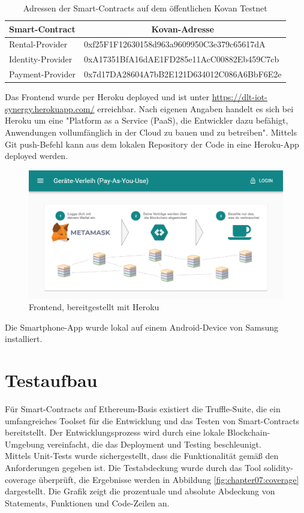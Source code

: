 \begin{table}[htbp]
\caption{Adressen der Smart-Contracts auf dem öffentlichen Kovan Testnet}
\label{tab:addresses}
\begin{tabular}{@{}ll@{}}
\toprule
\textbf{Smart-Contract} & \multicolumn{1}{c}{\textbf{Kovan-Adresse}} \\ \midrule
Rental-Provider & 0xf25F1F12630158d963a9609950C3e379c65617dA \\
Identity-Provider & 0xA17351BfA16dAE1FD285e11AcC00882Eb459C7cb \\
Payment-Provider & 0x7d17DA28604A7bB2E121D634012C086A6BbF6E2e \\ \bottomrule
\end{tabular}
\end{table}

Das Frontend wurde per Heroku deployed und ist unter \url{https://dlt-iot-synergy.herokuapp.com/} erreichbar. Nach eigenen Angaben handelt es sich bei Heroku um eine "Platform as a Service (PaaS), die Entwickler dazu befähigt, Anwendungen vollumfänglich in der Cloud zu bauen und zu betreiben". Mittels Git push-Befehl kann aus dem lokalen Repository der Code in eine Heroku-App deployed werden.

\begin{figure}[h]
 \centering
 \includegraphics[width=1.0\textwidth]{gfx/screenshots/frontend.PNG}
 \caption{Frontend, bereitgestellt mit Heroku}
 \label{fig:chapter07:frontend}
\end{figure}

Die Smartphone-App wurde lokal auf einem Android-Device von Samsung installiert.

\section{Testaufbau}
\label{sec:implementation:poc:testing}
Für Smart-Contracts auf Ethereum-Basis existiert die Truffle-Suite, die ein umfangreiches Toolset für die Entwicklung und das Testen von Smart-Contracts bereitstellt. Der Entwicklungsprozess wird durch eine lokale Blockchain-Umgebung vereinfacht, die das Deployment und Testing beschleunigt.\\
Mittels Unit-Tests wurde sichergestellt, dass die Funktionalität gemäß den Anforderungen gegeben ist. Die Testabdeckung wurde durch das Tool solidity-coverage überprüft, die Ergebnisse werden in Abbildung \ref{fig:chapter07:coverage} dargestellt. Die Grafik zeigt die prozentuale und absolute Abdeckung von Statements, Funktionen und Code-Zeilen an.\\

